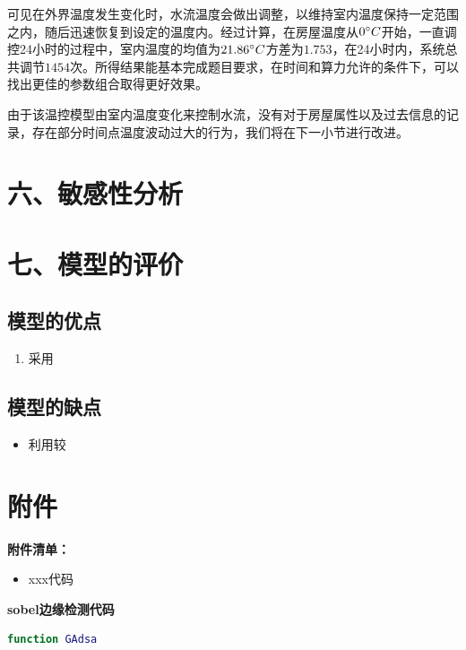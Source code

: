 \documentclass{my_paper}
\begin{document}
可见在外界温度发生变化时，水流温度会做出调整，以维持室内温度保持一定范围之内，随后迅速恢复到设定的温度内。经过计算，在房屋温度从$0\degree C$开始，一直调控24小时的过程中，室内温度的均值为$21.86\degree C$方差为$1.753$，在24小时内，系统总共调节$1454$次。所得结果能基本完成题目要求，在时间和算力允许的条件下，可以找出更佳的参数组合取得更好效果。

由于该温控模型由室内温度变化来控制水流，没有对于房屋属性以及过去信息的记录，存在部分时间点温度波动过大的行为，我们将在下一小节进行改进。
\subsection{}
\section{六、敏感性分析}
\section{七、模型的评价}

\subsection{模型的优点}
\begin{enumerate}
    \item 采用

\end{enumerate}

\subsection{模型的缺点}
\begin{itemize}
    \item 利用较

\end{itemize}

\newpage
\begin{center}
\end{center}

\newpage
\section{附件}
\textbf{附件清单：}
\renewcommand\theenumi{\roman{enumi}}
\renewcommand\labelenumi{\textbf{附录\theenumi}}
\begin{itemize}
    \item xxx代码
\end{itemize}

\textbf{sobel边缘检测代码}

\begin{lstlisting}[language=matlab]
    function GAdsa 
\end{lstlisting}
\end{document}
